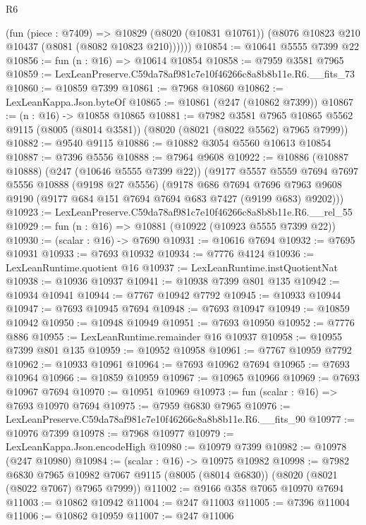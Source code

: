 \begin{lexlean}{R6}
\begin{coremodule}
        (fun (piece : @7409) =>
        @10829 (@8020 (@10831 @10761)) (@8076 @10823 @210 @10437 (@8081 (@8082 @10823 @210))))))
@10854 := @10641 @5555 @7399 @22
@10856 := fun (n : @16) => @10614 @10854
@10858 := @7959 @3581 @7965
@10859 := LexLeanPreserve.C59da78af981c7e10f46266c8a8b8b11e.R6.__fits_73
@10860 := @10859 @7399
@10861 := @7968 @10860
@10862 := LexLeanKappa.Json.byteOf
@10865 := @10861 (@247 (@10862 @7399))
@10867 := (n : @16) -> @10858 @10865
@10881 := @7982
    @3581
    @7965
    @10865
    @5562
    @9115
    (@8005 (@8014 @3581))
    (@8020 (@8021 (@8022 @5562) @7965 @7999))
@10882 := @9540 @9115
@10886 := @10882 @3054 @5560 @10613 @10854
@10887 := @7396 @5556
@10888 := @7964 @9608
@10922 := @10886
    (@10887 @10888)
    (@247 (@10646 @5555 @7399 @22))
    (@9177
      @5557
      @5559
      @7694
      @7697
      @5556
      @10888
      (@9198 @27 @5556)
      (@9178
        @686
        @7694
        @7696
        @7963
        @9608
        @9190
        (@9177 @684 @151 @7694 @7694 @683 @7427 (@9199 @683) @9202)))
@10923 := LexLeanPreserve.C59da78af981c7e10f46266c8a8b8b11e.R6.__rel_55
@10929 := fun (n : @16) => @10881 (@10922 (@10923 @5555 @7399 @22))
@10930 := (scalar : @16) -> @7690
@10931 := @10616 @7694
@10932 := @7695 @10931
@10933 := @7693 @10932
@10934 := @7776 @4124
@10936 := LexLeanRuntime.quotient @16
@10937 := LexLeanRuntime.instQuotientNat
@10938 := @10936 @10937
@10941 := @10938 @7399 @801 @135
@10942 := @10934 @10941
@10944 := @7767 @10942 @7792
@10945 := @10933 @10944
@10947 := @7693 @10945 @7694
@10948 := @7693 @10947
@10949 := @10859 @10942
@10950 := @10948 @10949
@10951 := @7693 @10950
@10952 := @7776 @886
@10955 := LexLeanRuntime.remainder @16 @10937
@10958 := @10955 @7399 @801 @135
@10959 := @10952 @10958
@10961 := @7767 @10959 @7792
@10962 := @10933 @10961
@10964 := @7693 @10962 @7694
@10965 := @7693 @10964
@10966 := @10859 @10959
@10967 := @10965 @10966
@10969 := @7693 @10967 @7694
@10970 := @10951 @10969
@10973 := fun (scalar : @16) => @7693 @10970 @7694
@10975 := @7959 @6830 @7965
@10976 := LexLeanPreserve.C59da78af981c7e10f46266c8a8b8b11e.R6.__fits_90
@10977 := @10976 @7399
@10978 := @7968 @10977
@10979 := LexLeanKappa.Json.encodeHigh
@10980 := @10979 @7399
@10982 := @10978 (@247 @10980)
@10984 := (scalar : @16) -> @10975 @10982
@10998 := @7982
    @6830
    @7965
    @10982
    @7067
    @9115
    (@8005 (@8014 @6830))
    (@8020 (@8021 (@8022 @7067) @7965 @7999))
@11002 := @9166 @358 @7065 @10970 @7694
@11003 := @10862 @10942
@11004 := @247 @11003
@11005 := @7396 @11004
@11006 := @10862 @10959
@11007 := @247 @11006

\end{coremodule}
\end{lexlean}
